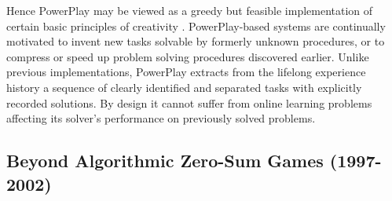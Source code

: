 \documentclass{article}
\begin{document}
Hence {\sc PowerPlay} may be viewed as a  greedy
but  feasible implementation of certain basic principles of creativity \cite{Schmidhuber:06cs,Schmidhuber:10ieeetamd}.
{\sc PowerPlay}-based systems are
continually motivated to invent new tasks solvable by formerly unknown procedures, 
or to compress or speed up problem solving procedures discovered earlier.
Unlike previous implementations,
{\sc PowerPlay} extracts from the lifelong experience history a sequence of clearly identified and separated tasks
with explicitly recorded solutions. By design it cannot suffer from online learning problems 
affecting its solver's
performance on previously solved problems.

\subsection{Beyond Algorithmic Zero-Sum Games \cite{Schmidhuber:99cec,Schmidhuber:02predictable} (1997-2002)}
\label{zerosum}
\end{document}

